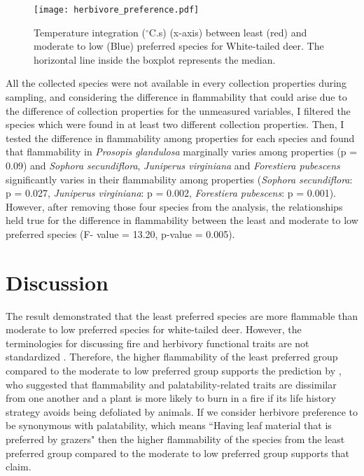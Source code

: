 \documentclass[12pt]{report}
\begin{document}
\begin{figure}
    \centering
    \texttt{[image: herbivore\_preference.pdf]}
    \caption{Temperature integration ($^{\circ}$C.s) (x-axis) between least (red) and moderate to low (Blue) preferred species for White-tailed deer. The horizontal line inside the boxplot represents the median.}   
\end{figure}





 All the collected species were not available in every collection properties during sampling, and considering the difference in flammability that could arise due to the difference of collection properties for the unmeasured variables, I filtered the species which were found in at least two different collection properties. Then, I tested the difference in flammability among properties for each species and found that flammability in \emph{Prosopis glandulosa} marginally varies among properties (p = 0.09) and \emph{Sophora secundiflora}, \emph{Juniperus virginiana} and \emph{Forestiera pubescens} significantly varies in their flammability among properties (\emph{Sophora secundiflora}: p = 0.027, \emph{Juniperus virginiana}: p = 0.002, \emph{Forestiera pubescens}: p = 0.001). However, after removing those four species from the analysis, the relationships held true for the difference in flammability between the least and moderate to low preferred species (F- value = 13.20, p-value = 0.005).

\section{Discussion}

The result demonstrated that the least preferred species are more flammable than moderate to low preferred species for white-tailed deer. However, the terminologies for discussing fire and herbivory functional traits are not standardized \citep{archibald2019unified}. Therefore, the higher flammability of the least preferred group compared to the moderate to low preferred group supports the prediction by \citep{archibald2019unified}, who suggested that flammability and palatability-related traits are dissimilar from one another and a plant is more likely to burn in a fire if its life history strategy avoids being defoliated by animals. If we consider herbivore preference to be synonymous with palatability, which means ``Having leaf material that is preferred by grazers" \citep{archibald2019unified} then the higher flammability of the species from the least preferred group compared to the moderate to low preferred group supports that claim.\\
\end{document}
